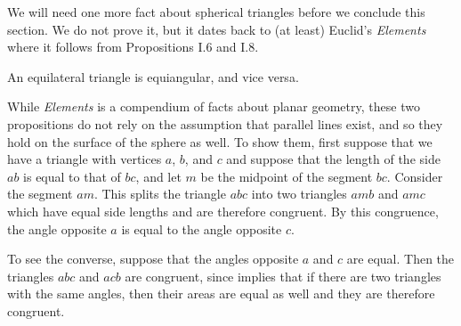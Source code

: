 We will need one more fact about spherical triangles before we conclude this section.  We do not prove it, but it dates back to (at least) Euclid's \textit{Elements} \cite{elements} where it follows from Propositions I.6 and I.8.  

\begin{fact}
	An equilateral triangle is equiangular, and vice versa.
\end{fact}

While \textit{Elements} is a compendium of facts about planar geometry, these two propositions do not rely on the assumption that parallel lines exist, and so they hold on the surface of the sphere as well.  To show them, first suppose that we have a triangle with vertices $a$, $b$, and $c$ and suppose that the length of the side $ab$ is equal to that of $bc$, and let $m$ be the midpoint of the segment $bc$.  Consider the segment $am$. This splits the triangle $abc$ into two triangles $amb$ and $amc$ which have equal side lengths and are therefore congruent.  By this congruence, the angle opposite $a$ is equal to the angle opposite $c$.

To see the converse, suppose that the angles opposite $a$ and $c$ are equal.  Then the triangles $abc$ and $acb$ are congruent, since  implies that if there are two triangles with the same angles, then their areas are equal as well and they are therefore congruent.


